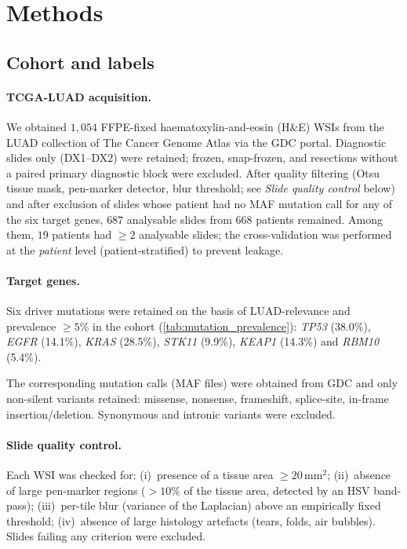 \section*{Methods}

\subsection*{Cohort and labels}

\paragraph{TCGA-LUAD acquisition.}
We obtained $1{,}054$ FFPE-fixed haematoxylin-and-eosin (H\&E) WSIs
from the LUAD collection of The Cancer Genome Atlas via the
GDC portal.\cite{tcga2014luad,gdc2024maf}
Diagnostic slides only (DX1--DX2) were retained; frozen, snap-frozen,
and resections without a paired primary diagnostic block were
excluded.
After quality filtering (Otsu tissue mask, pen-marker detector,
blur threshold; see \emph{Slide quality control} below) and after
exclusion of slides whose patient had no MAF mutation call for any
of the six target genes, $687$ analysable slides from $668$
patients remained.
Among them, $19$ patients had $\geq 2$ analysable slides; the
cross-validation was performed at the \emph{patient} level
(patient-stratified) to prevent leakage.

\paragraph{Target genes.}
Six driver mutations were retained on the basis of
LUAD-relevance and prevalence $\geq 5\%$ in the cohort
(\cref{tab:mutation_prevalence}):
\textit{TP53} (38.0\%), \textit{EGFR} (14.1\%), \textit{KRAS}
(28.5\%), \textit{STK11} (9.9\%), \textit{KEAP1} (14.3\%) and
\textit{RBM10} (5.4\%).

The corresponding mutation calls (MAF files) were obtained from
GDC and only non-silent variants retained: missense, nonsense,
frameshift, splice-site, in-frame insertion/deletion.
Synonymous and intronic variants were excluded.

\paragraph{Slide quality control.}
Each WSI was checked for: (i)~presence of a tissue area
$\geq 20\,\text{mm}^{2}$; (ii)~absence of large pen-marker
regions ($>10\%$ of the tissue area, detected by an HSV
band-pass); (iii)~per-tile blur (variance of the Laplacian)
above an empirically fixed threshold; (iv)~absence of large
histology artefacts (tears, folds, air bubbles).
Slides failing any criterion were excluded.

